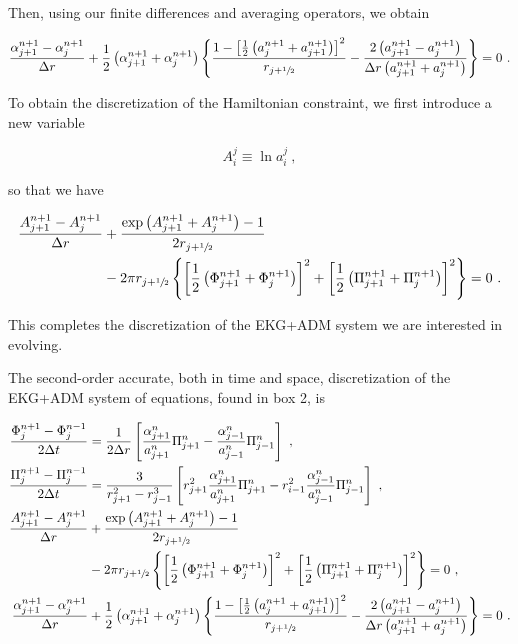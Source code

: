 \documentclass[a4paper,11pt]{article}
\renewcommand{\a}{\alpha}
\newcommand{\nn}{\nonumber}
\newcommand{\dt}{\Delta t}
\newcommand{\dr}{\Delta r}
\newcommand{\lrpar}[1]{\left( #1 \right)}
\newcommand{\lrsquare}[1]{\left[ #1 \right]}
\newcommand{\lrcurly}[1]{\left\{ #1 \right\}}
\newcommand{\n}{\noindent}
\newcommand{\eq}[1]{
  \begin{equation}
    #1
  \end{equation}
}
\newcommand{\al}[1]{
  \begin{align}
    #1
  \end{align}
}
\newcommand{\parboxbreak}[2]{
  
  \vspace*{0.25in}
  
  \begin{tcolorbox}[breakable, pad at break=1mm, before=\centering,title=Box #1,colback=blue!5!white,colframe=gray!75!black]
    #2
  \end{tcolorbox}

  \vspace*{0.25in}

}
\begin{document}
\n Then, using our finite differences and averaging operators, we obtain

\eq{
  \frac{\a^{n+1}_{j+1}-\a^{n+1}_{j}}{\dr}+\frac{1}{2}\lrpar{\a^{n+1}_{j+1}+\a^{n+1}_{j}}\lrcurly{\frac{1-\lrsquare{\frac{1}{2}\lrpar{a^{n+1}_{j}+a^{n+1}_{j+1}}}^2}{r_{j+\sfrac{1}{2}}}-\frac{2\lrpar{a^{n+1}_{j+1}-a^{n+1}_{j}}}{\dr\lrpar{a^{n+1}_{j+1}+a^{n+1}_{j}}}}=0\ .
}

To obtain the discretization of the Hamiltonian constraint, we first introduce a new variable

\eq{ A^{j}_{i} \equiv \ln a^{j}_{i}\ , }

\n so that we have

\al{
\frac{A^{n+1}_{j+1}-A^{n+1}_{j}}{\dr}&+\frac{\exp\lrpar{A^{n+1}_{j+1}+A^{n+1}_{j}}-1}{2r_{j+\sfrac{1}{2}}}\nn\\
&-2\pi r_{j+\sfrac{1}{2}}\lrcurly{\lrsquare{\frac{1}{2}\lrpar{\Phi^{n+1}_{j+1}+\Phi^{n+1}_{j}}}^2+\lrsquare{\frac{1}{2}\lrpar{\Pi^{n+1}_{j+1}+\Pi^{n+1}_{j}}}^2}=0\ .
}

\n This completes the discretization of the EKG+ADM system we are interested in evolving.

\parboxbreak{3: The discretization of the EKG+ADM system of equations}{

  The second-order accurate, both in time and space, discretization of the EKG+ADM system of equations, found in box 2, is

  \al{
    \frac{\Phi^{n+1}_{j} - \Phi^{n-1}_{j}}{2\dt} &= \frac{1}{2\dr}\lrsquare{\frac{\a^{n}_{j+1}}{a^{n}_{j+1}}\Pi^{n}_{j+1} - \frac{\a^{n}_{j-1}}{a^{n}_{j-1}}\Pi^{n}_{j-1}}\ ,\nn\\
    \frac{\Pi^{n+1}_{j}  - \Pi^{n-1}_{j}}{2\dt}  &= \frac{3}{r_{j+1}^{2} - r_{j-1}^{3}}\lrsquare{r^{2}_{j+1}\frac{\a^{n}_{j+1}}{a^{n}_{j+1}}\Pi^{n}_{j+1} - r^{2}_{i-1}\frac{\a^{n}_{j-1}}{a^{n}_{j-1}}\Pi^{n}_{j-1}}\ ,\nn\\
    \frac{A^{n+1}_{j+1}-A^{n+1}_{j}}{\dr}&+\frac{\exp\lrpar{A^{n+1}_{j+1}+A^{n+1}_{j}}-1}{2r_{j+\sfrac{1}{2}}}\nn\\
    &-2\pi r_{j+\sfrac{1}{2}}\lrcurly{\lrsquare{\frac{1}{2}\lrpar{\Phi^{n+1}_{j+1}+\Phi^{n+1}_{j}}}^2+\lrsquare{\frac{1}{2}\lrpar{\Pi^{n+1}_{j+1}+\Pi^{n+1}_{j}}}^2}=0\ ,\nn\\
    \frac{\a^{n+1}_{j+1}-\a^{n+1}_{j}}{\dr}&+\frac{1}{2}\lrpar{\a^{n+1}_{j+1}+\a^{n+1}_{j}}\lrcurly{\frac{1-\lrsquare{\frac{1}{2}\lrpar{a^{n+1}_{j}+a^{n+1}_{j+1}}}^2}{r_{j+\sfrac{1}{2}}}-\frac{2\lrpar{a^{n+1}_{j+1}-a^{n+1}_{j}}}{\dr\lrpar{a^{n+1}_{j+1}+a^{n+1}_{j}}}}=0\ .\nn
  }
  
}
\end{document}
